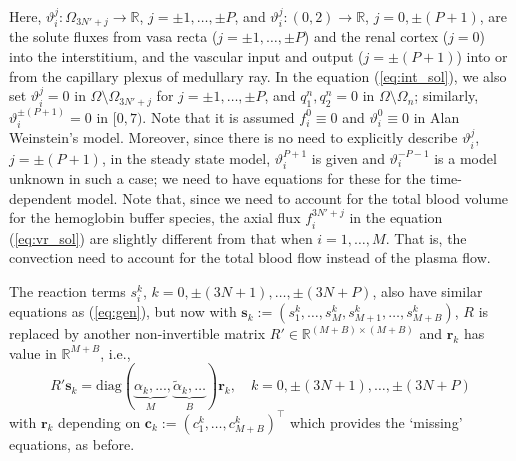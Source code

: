\documentclass{article}
\begin{document}
Here, $\vartheta_i^j:\Omega_{3N'+j}\to \mathbb{R}$, $j=\pm 1,\dots,\pm P$, and $\vartheta_i^j:(0,2)\to \mathbb{R}$, $j=0,\pm(P+1)$, are the solute fluxes from vasa recta ($j=\pm 1,\dots,\pm P$) and the renal cortex ($j=0$) into the interstitium, and the vascular input and output ($j=\pm(P+1)$) into or from the capillary plexus of medullary ray.
In the equation (\ref{eq:int_sol}), we also set $\vartheta_i^j=0$ in $\Omega\setminus \Omega_{3N'+j}$ for $j=\pm 1,\dots,\pm P$, and $q_1^n,q_2^n=0$ in $\Omega\setminus\Omega_n$; similarly, $\vartheta_i^{\pm(P+1)} = 0$ in $[0,7)$.
Note that it is assumed $f_i^0\equiv 0$ and $\vartheta_i^0\equiv 0$ in Alan Weinstein's model.
Moreover, since there is no need to explicitly describe $\vartheta_i^j$, $j=\pm(P+1)$, in the steady state model, $\vartheta_i^{P+1}$ is given and $\vartheta_i^{-P-1}$ is a model unknown in such a case; we need to have equations for these for the time-dependent model.
Note that, since we need to account for the total blood volume for the hemoglobin buffer species, the axial flux $f_i^{3N'+j}$ in the equation (\ref{eq:vr_sol}) are slightly different from that when $i=1,\dots,M$.
That is, the convection need to account for the total blood flow instead of the plasma flow.

The reaction terms $s_i^k$, $k=0,\pm(3N+1),\dots,\pm(3N+P)$, also have similar equations as (\ref{eq:gen}), but now with $\mathbf{s}_k:=(s_1^k,\dots,s_M^k,s_{M+1}^k,\dots,s_{M+B}^k)$, $R$ is replaced by another non-invertible matrix $R'\in \mathbb{R}^{(M+B)\times (M+B)}$ and $\mathbf{r}_k$ has value in $\mathbb{R}^{M+B}$, i.e.,
\begin{equation}
    R'\mathbf{s}_k=\mathrm{diag}(\underbrace{\alpha_k,...}_{M},\underbrace{\tilde{\alpha}_k,\dots}_B)\mathbf{r}_k,\quad k=0,\pm(3N+1),\dots,\pm(3N+P)
\end{equation}
with $\mathbf{r}_k$ depending on $\mathbf{c}_k:=(c_1^k,\dots,c_{M+B}^k)^\top$ which provides the `missing' equations, as before.
\end{document}
